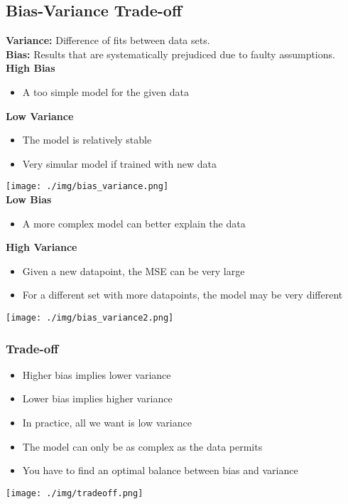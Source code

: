\subsection{Bias-Variance Trade-off}
\textbf{Variance:} Difference of fits between data sets.\\ 
\textbf{Bias:} Results that are systematically prejudiced due to faulty assumptions.\\
\textbf{High Bias}
\begin{itemize}
    \item A too simple model for the given data
\end{itemize}
\textbf{Low Variance}
\begin{itemize}
    \item The model is relatively stable
    \item Very simular model if trained with new data
\end{itemize}
\texttt{[image: ./img/bias\_variance.png]}\\
\textbf{Low Bias}
\begin{itemize}
    \item A more complex model can better explain the data
\end{itemize}
\textbf{High Variance}
\begin{itemize}
    \item Given a new datapoint, the MSE can be very large
    \item For a different set with more datapoints, the model may be very different
\end{itemize}
\texttt{[image: ./img/bias\_variance2.png]}

\subsubsection{Trade-off}
\begin{itemize}
    \item Higher bias implies lower variance
    \item Lower bias implies higher variance
    \item In practice, all we want is low variance
    \item The model can only be as complex as the data permits
    \item You have to find an optimal balance between bias and variance
\end{itemize}
\texttt{[image: ./img/tradeoff.png]}

